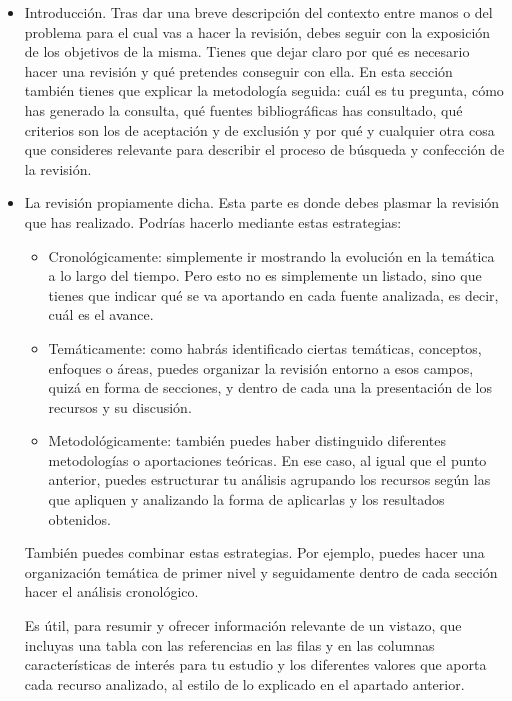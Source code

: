 \begin{itemize}
    \item Introducción. Tras dar una breve descripción del contexto entre manos o del problema para el cual vas a hacer la revisión, debes seguir con la exposición de los objetivos de la misma.  Tienes que dejar claro por qué es necesario hacer una revisión y qué pretendes conseguir con ella. En esta sección también tienes que explicar la metodología seguida: cuál es tu pregunta, cómo has generado la consulta, qué fuentes bibliográficas has consultado, qué criterios son los de aceptación y de exclusión y por qué y cualquier otra cosa que consideres relevante para describir el proceso de búsqueda y confección de la revisión.

    \item La revisión propiamente dicha. Esta parte es donde debes plasmar la revisión que has realizado. Podrías hacerlo mediante estas estrategias:

    \begin{itemize}
        \item Cronológicamente: simplemente ir mostrando la evolución en la temática a lo largo del tiempo. Pero esto no es simplemente un listado, sino que tienes que indicar qué se va aportando en cada fuente analizada, es decir, cuál es el avance.

        \item Temáticamente: como habrás identificado ciertas temáticas, conceptos, enfoques o áreas, puedes organizar la revisión entorno a esos campos, quizá en forma de secciones, y dentro de cada una la presentación de los recursos y su discusión.

        \item Metodológicamente: también puedes haber distinguido diferentes metodologías o aportaciones teóricas. En ese caso, al igual que el punto anterior, puedes estructurar tu análisis agrupando los recursos según las que apliquen y analizando la forma de aplicarlas y los resultados obtenidos.
    \end{itemize}
    
    También puedes combinar estas estrategias. Por ejemplo, puedes hacer una organización temática de primer nivel y seguidamente dentro de cada sección hacer el análisis cronológico.

    Es útil, para resumir y ofrecer información relevante de un vistazo, que incluyas una tabla con las referencias en las filas y en las columnas características de interés para tu estudio y los diferentes valores que aporta cada recurso analizado, al estilo de lo explicado en el apartado anterior.


\end{itemize}
